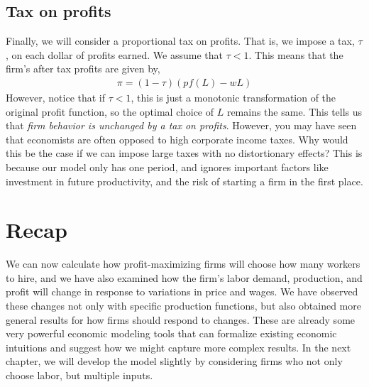 \subsection*{Tax on profits}
Finally, we will consider a proportional tax on profits. That is, we impose a tax, $\tau$, on each dollar of profits earned. We assume that $\tau < 1$. This means that the firm's after tax profits are given by,
\begin{align*}
    \pi = (1 - \tau) \left(p f(L) - w L \right)
\end{align*}
However, notice that if $\tau < 1$, this is just a monotonic transformation of the original profit function, so the optimal choice of $L$ remains the same. This tells us that \emph{firm behavior is unchanged by a tax on profits}. However, you may have seen that economists are often opposed to high corporate income taxes. Why would this be the case if we can impose large taxes with no distortionary effects? This is because our model only has one period, and ignores important factors like investment in future productivity, and the risk of starting a firm in the first place.

\section*{Recap}
We can now calculate how profit-maximizing firms will choose how many workers to hire, and we have also examined how the firm's labor demand, production, and profit will change in response to variations in price and wages. We have observed these changes not only with specific production functions, but also obtained more general results for how firms should respond to changes. These are already some very powerful economic modeling tools that can formalize existing economic intuitions and suggest how we might capture more complex results. In the next chapter, we will develop the model slightly by considering firms who not only choose labor, but multiple inputs. 
